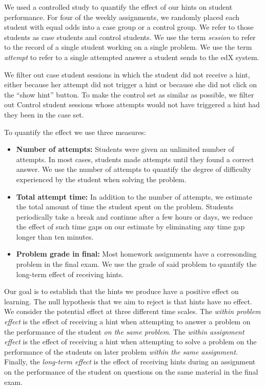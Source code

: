 \documentclass{llncs}
\begin{document}
We used a controlled study to quantify the effect of our hints on
student performance. For four of the weekly assignments, we randomly
placed each student with equal odds into a case group or a control
group. We refer to those students as case students and control
students.  We use the term {\em session} to refer to the record of a
single student working on a single problem. We use the term {\em
  attempt} to refer to a single attempted answer a student sends to
the edX system.

We filter out case student sessions in which the student did not
receive a hint, either because her attempt did not trigger a hint or
because she did not click on the ``show hint'' button.  To make the
control set as similar as possible, we filter out Control student
sessions whose attempts would not have triggered a hint had they been
in the case set.

To quantify the effect we use three measures:
\begin{itemize}
\item {\bf Number of attempts:} Students were given an unlimited number of attempts. In most cases, students made attempts until they found a correct answer. We use the number of attempts to quantify the degree of difficulty experienced by the student when solving the problem.

\item {\bf Total attempt time:} In addition to the number of attempts, we estimate the total amount of time the student spent on the problem. Students periodically take a break and continue after a few hours or days, we reduce the effect of such time gaps on our estimate by eliminating any time gap longer than ten minutes.
\item {\bf Problem grade in final:} Most homework assignments have a corresonding problem in the final exam. We use the grade of said problem to quantify the long-term effect of receiving hints. 
\end{itemize}

Our goal is to establish that the hints we produce have a positive
effect on learning. The null hypothesis that we aim to reject is that
hints have no effect. We consider the potential effect at three
different time scales. The {\em within problem effect} is the effect
of receiving a hint when attempting to answer a problem on the
performance of the student {\em on the same problem}. The {\em within
  assignment effect} is the effect of receiving a hint when attempting
to solve a problem on the performance of the students on later problem
{\em within the same assignment}. Finally, the {\em long-term effect}
is the effect of receiving hints during an assignment on the
performance of the student on questions on the same material in the
final exam.
\end{document}
